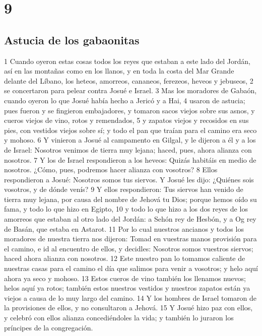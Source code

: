 \chapter{9}

\section*{Astucia de los gabaonitas}


1 Cuando oyeron estas cosas todos los reyes que estaban a este lado del Jordán, así en las montañas como en los llanos, y en toda la costa del Mar Grande delante del Líbano, los heteos, amorreos, cananeos, ferezeos, heveos y jebuseos,
2 se concertaron para pelear contra Josué e Israel.
3 Mas los moradores de Gabaón, cuando oyeron lo que Josué había hecho a Jericó y a Hai,
4 usaron de astucia; pues fueron y se fingieron embajadores, y tomaron sacos viejos sobre sus asnos, y cueros viejos de vino, rotos y remendados,
5 y zapatos viejos y recosidos en sus pies, con vestidos viejos sobre sí; y todo el pan que traían para el camino era seco y mohoso.
6 Y vinieron a Josué al campamento en Gilgal, y le dijeron a él y a los de Israel: Nosotros venimos de tierra muy lejana; haced, pues, ahora alianza con nosotros.
7 Y los de Israel respondieron a los heveos: Quizás habitáis en medio de nosotros. ¿Cómo, pues, podremos hacer alianza con vosotros?
8 Ellos respondieron a Josué: Nosotros somos tus siervos. Y Josué les dijo: ¿Quiénes sois vosotros, y de dónde venís?
9 Y ellos respondieron: Tus siervos han venido de tierra muy lejana, por causa del nombre de Jehová tu Dios; porque hemos oído su fama, y todo lo que hizo en Egipto,
10 y todo lo que hizo a los dos reyes de los amorreos que estaban al otro lado del Jordán: a Sehón rey de Hesbón, y a Og rey de Basán, que estaba en Astarot. 
11 Por lo cual nuestros ancianos y todos los moradores de nuestra tierra nos dijeron: Tomad en vuestras manos provisión para el camino, e id al encuentro de ellos, y decidles: Nosotros somos vuestros siervos; haced ahora alianza con nosotros.
12 Este nuestro pan lo tomamos caliente de nuestras casas para el camino el día que salimos para venir a vosotros; y helo aquí ahora ya seco y mohoso.
13 Estos cueros de vino también los llenamos nuevos; helos aquí ya rotos; también estos nuestros vestidos y nuestros zapatos están ya viejos a causa de lo muy largo del camino.
14 Y los hombres de Israel tomaron de la provisiones de ellos, y no consultaron a Jehová.
15 Y Josué hizo paz con ellos, y celebró con ellos alianza concediéndoles la vida; y también lo juraron los príncipes de la congregación.
